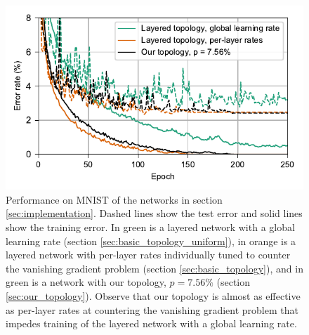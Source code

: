 \documentclass[utf8]{frontiersSCNS}
\begin{document}
\begin{figure}[h!]
\begin{center}
\includegraphics[width=\textwidth]{figures/MNIST_network_comparison.pdf}
\end{center}
\caption{Performance on MNIST of the networks in section \ref{sec:implementation}. Dashed lines show the test error and solid lines show the training error. In green is a layered network with a global learning rate (section \ref{sec:basic_topology_uniform}), in orange is a layered network with per-layer rates individually tuned to counter the vanishing gradient problem (section \ref{sec:basic_topology}), and in green is a network with our topology, $p=7.56\%$ (section \ref{sec:our_topology}). Observe that our topology is almost as effective as per-layer rates at countering the vanishing gradient problem that impedes training of the layered network with a global learning rate.} \label{fig:mnist_comparison}
\end{figure}
\end{document}
